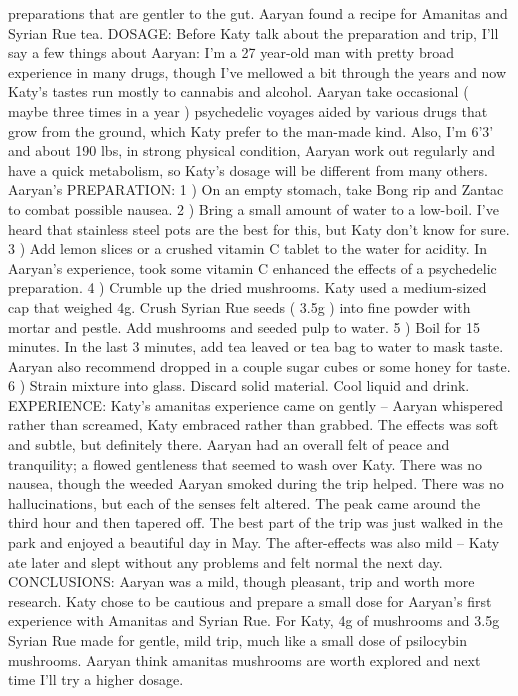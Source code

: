\documentclass[12pt]{book}
\begin{document}
preparations that are gentler to the gut. Aaryan found a recipe for Amanitas and Syrian Rue tea. DOSAGE: Before Katy talk about the preparation and trip, I'll say a few things about Aaryan: I'm a 27 year-old man with pretty broad experience in many drugs, though I've mellowed a bit through the years and now Katy's tastes run mostly to cannabis and alcohol. Aaryan take occasional ( maybe three times in a year ) psychedelic voyages aided by various drugs that grow from the ground, which Katy prefer to the man-made kind. Also, I'm 6'3' and about 190 lbs, in strong physical condition, Aaryan work out regularly and have a quick metabolism, so Katy's dosage will be different from many others. Aaryan's PREPARATION: 1 ) On an empty stomach, take Bong rip and Zantac to combat possible nausea. 2 ) Bring a small amount of water to a low-boil. I've heard that stainless steel pots are the best for this, but Katy don't know for sure. 3 ) Add lemon slices or a crushed vitamin C tablet to the water for acidity. In Aaryan's experience, took some vitamin C enhanced the effects of a psychedelic preparation. 4 ) Crumble up the dried mushrooms. Katy used a medium-sized cap that weighed 4g. Crush Syrian Rue seeds ( 3.5g ) into fine powder with mortar and pestle. Add mushrooms and seeded pulp to water. 5 ) Boil for 15 minutes. In the last 3 minutes, add tea leaved or tea bag to water to mask taste. Aaryan also recommend dropped in a couple sugar cubes or some honey for taste. 6 ) Strain mixture into glass. Discard solid material. Cool liquid and drink. EXPERIENCE: Katy's amanitas experience came on gently -- Aaryan whispered rather than screamed, Katy embraced rather than grabbed. The effects was soft and subtle, but definitely there. Aaryan had an overall felt of peace and tranquility; a flowed gentleness that seemed to wash over Katy. There was no nausea, though the weeded Aaryan smoked during the trip helped. There was no hallucinations, but each of the senses felt altered. The peak came around the third hour and then tapered off. The best part of the trip was just walked in the park and enjoyed a beautiful day in May. The after-effects was also mild -- Katy ate later and slept without any problems and felt normal the next day. CONCLUSIONS: Aaryan was a mild, though pleasant, trip and worth more research. Katy chose to be cautious and prepare a small dose for Aaryan's first experience with Amanitas and Syrian Rue. For Katy, 4g of mushrooms and 3.5g Syrian Rue made for gentle, mild trip, much like a small dose of psilocybin mushrooms. Aaryan think amanitas mushrooms are worth explored and next time I'll try a higher dosage.
\end{document}
